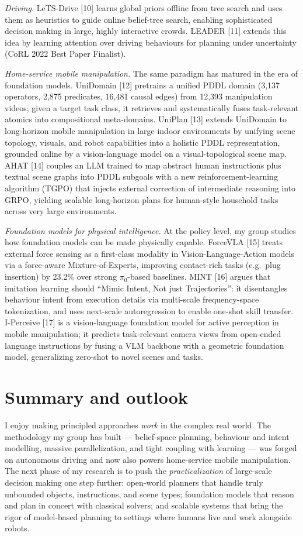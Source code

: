 \documentclass{article}
\begin{document}
\textit{Driving.} LeTS-Drive [10] learns global priors offline from tree search and uses them as heuristics to guide online belief-tree search, enabling sophisticated decision making in large, highly interactive crowds. LEADER [11] extends this idea by learning attention over driving behaviours for planning under uncertainty (CoRL 2022 Best Paper Finalist).

\textit{Home-service mobile manipulation.} The same paradigm has matured in the era of foundation models. UniDomain [12] pretrains a unified PDDL domain (3{,}137 operators, 2{,}875 predicates, 16{,}481 causal edges) from 12{,}393 manipulation videos; given a target task class, it retrieves and systematically fuses task-relevant atomics into compositional meta-domains. UniPlan [13] extends UniDomain to long-horizon mobile manipulation in large indoor environments by unifying scene topology, visuals, and robot capabilities into a holistic PDDL representation, grounded online by a vision-language model on a visual-topological scene map. AHAT [14] couples an LLM trained to map abstract human instructions plus textual scene graphs into PDDL subgoals with a new reinforcement-learning algorithm (TGPO) that injects external correction of intermediate reasoning into GRPO, yielding scalable long-horizon plans for human-style household tasks across very large environments.

\textit{Foundation models for physical intelligence.} At the policy level, my group studies how foundation models can be made physically capable. ForceVLA [15] treats external force sensing as a first-class modality in Vision-Language-Action models via a force-aware Mixture-of-Experts, improving contact-rich tasks (e.g.\ plug insertion) by 23.2\% over strong $\pi_0$-based baselines. MINT [16] argues that imitation learning should ``Mimic Intent, Not just Trajectories'': it disentangles behaviour intent from execution details via multi-scale frequency-space tokenization, and uses next-scale autoregression to enable one-shot skill transfer. I-Perceive [17] is a vision-language foundation model for active perception in mobile manipulation; it predicts task-relevant camera views from open-ended language instructions by fusing a VLM backbone with a geometric foundation model, generalizing zero-shot to novel scenes and tasks.

\section*{Summary and outlook}
I enjoy making principled approaches \emph{work} in the complex real world. The methodology my group has built --- belief-space planning, behaviour and intent modelling, massive parallelization, and tight coupling with learning --- was forged on autonomous driving and now also powers home-service mobile manipulation. The next phase of my research is to push the \emph{practicalization} of large-scale decision making one step further: open-world planners that handle truly unbounded objects, instructions, and scene types; foundation models that reason and plan in concert with classical solvers; and scalable systems that bring the rigor of model-based planning to settings where humans live and work alongside robots.
\end{document}
